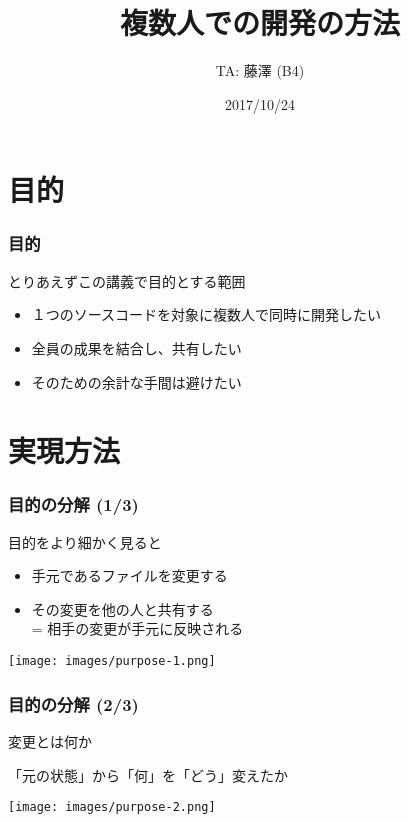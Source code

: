 \documentclass[12pt,dvipdfmx]{beamer}
\title{複数人での開発の方法}
\author{TA: 藤澤 (B4)}
\date{2017/10/24}
\begin{document}
\maketitle

\section{目的}

\begin{frame}[containsverbatim]
\frametitle{目的}

とりあえずこの講義で目的とする範囲

\begin{itemize}
\item １つのソースコードを対象に{\Large 複数人}で{\Large 同時}に開発したい
\item 全員の成果を結合し、{\Large 共有}したい
\item そのための余計な手間は避けたい
\end{itemize}
\end{frame}

\section{実現方法}

\begin{frame}[containsverbatim]
\frametitle{目的の分解 (1/3)}

目的をより細かく見ると

\begin{itemize}
\item 手元であるファイルを{\Large 変更}する
\item その{\Large 変更}を他の人と{\Large 共有}する \\
 = 相手の{\Large 変更}が手元に{\Large 反映}される
\end{itemize}

\begin{center}
  \texttt{[image: images/purpose-1.png]}
\end{center}
\end{frame}

\begin{frame}[containsverbatim]
\frametitle{目的の分解 (2/3)}

{\Large 変更}とは何か

\begin{center}
「元の状態」から「何」を「どう」変えたか
\end{center}

\begin{center}
  \texttt{[image: images/purpose-2.png]}
\end{center}
\end{frame}
\end{document}
